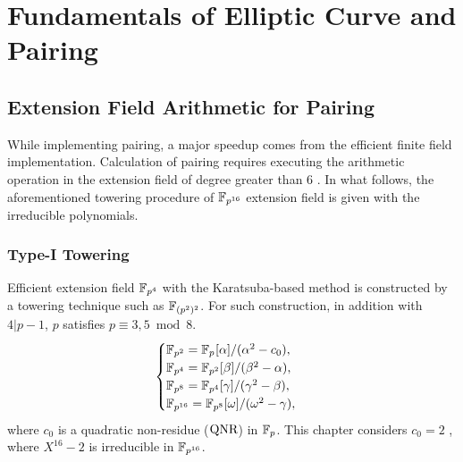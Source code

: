 \section{Fundamentals of Elliptic Curve and Pairing}\label{sec:1}
\subsection{Extension Field Arithmetic for Pairing}
While implementing pairing, a major speedup comes from the efficient finite field implementation. 
Calculation of pairing requires executing the arithmetic operation in the extension field {of degree greater than 6} \cite{EPRINT:BenSco09}.
In what follows, the aforementioned towering procedure of  $\mathbb{F}_{p^{16}}$ extension field is given with the irreducible polynomials.

\subsubsection{Type-I Towering}
Efficient extension field $\mathbb{F}_{p^4}$ with the Karatsuba-based method is constructed by a towering technique such as $\mathbb{F}_{(p^2)^2}$. 
For such construction, in addition with $4|p-1$, $p$ satisfies $p \equiv 3, 5 \bmod 8$.  
\begin{equation}\label{towering_1}
\begin{cases}
{\mathbb{F}}_{p^{2}} = {\mathbb{F}}_{p^{}}[\alpha]/(\alpha^2-c_0),  \\ 
{\mathbb{F}}_{p^{4}} = {\mathbb{F}}_{p^{2}}[\beta]/(\beta^2-\alpha),  \\ 
{\mathbb{F}}_{p^{8}} = {\mathbb{F}}_{p^{4}}[\gamma]/(\gamma^2-\beta), \\ 
{\mathbb{F}}_{p^{16}} = {\mathbb{F}}_{p^{8}}[\omega]/(\omega^2-\gamma), \\ 
\end{cases}
\end{equation}
where  $c_0$ is a quadratic non-residue  ($\mbox{QNR}$) in ${\mathbb{F}}_{p}$. 
This chapter considers  $c_0 = 2$ , where $X^{16}-2$ is irreducible in $\mathbb{F}_{p^{16}}$.

